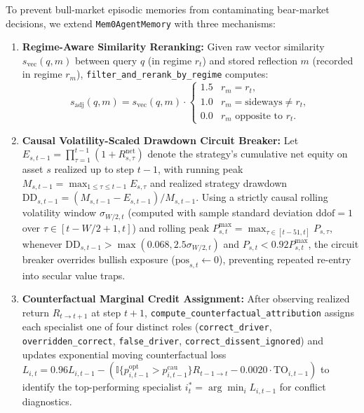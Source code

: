 \documentclass[10pt,a4paper,twocolumn]{article}
\begin{document}
To prevent bull-market episodic memories from contaminating bear-market decisions, we extend \texttt{Mem0AgentMemory} with three mechanisms:
\begin{enumerate}\sloppy
  \setlength{\itemsep}{1pt}\setlength{\parskip}{0pt}
  \item \textbf{Regime-Aware Similarity Reranking:} Given raw vector similarity $s_{\text{vec}}(q, m)$ between query $q$ (in regime $r_t$) and stored reflection $m$ (recorded in regime $r_m$), \texttt{filter\_and\_rerank\_by\_regime} computes:
  \begin{equation}
    s_{\text{adj}}(q, m) = s_{\text{vec}}(q, m) \cdot \begin{cases}
      1.5 & r_m = r_t, \\
      1.0 & r_m = \text{sideways} \neq r_t, \\
      0.0 & r_m \text{ opposite to } r_t.
    \end{cases}
  \end{equation}
  \item \textbf{Causal Volatility-Scaled Drawdown Circuit Breaker:} Let $E_{s,t-1} = \prod_{\tau=1}^{t-1} (1 + R_{s,\tau}^{\text{net}})$ denote the strategy's cumulative net equity on asset $s$ realized up to step $t-1$, with running peak $M_{s,t-1} = \max_{1 \le \tau \le t-1} E_{s,\tau}$ and realized strategy drawdown $\text{DD}_{s,t-1} = (M_{s,t-1} - E_{s,t-1}) / M_{s,t-1}$. Using a strictly causal rolling volatility window $\sigma_{W/2, t}$ (computed with sample standard deviation $\text{ddof}=1$ over $\tau \in [t - W/2 + 1, t]$) and rolling peak $P_{s,t}^{\max} = \max_{\tau \in [t-51, t]} P_{s,\tau}$, whenever $\text{DD}_{s,t-1} > \max(0.068, 2.5\sigma_{W/2,t})$ and $P_{s,t} < 0.92 P_{s,t}^{\max}$, the circuit breaker overrides bullish exposure ($\text{pos}_{s,t} \leftarrow 0$), preventing repeated re-entry into secular value traps.
  \item \textbf{Counterfactual Marginal Credit Assignment:} After observing realized return $R_{t \to t+1}$ at step $t+1$, \texttt{compute\_counterfactual\_attribution} assigns each specialist one of four distinct roles (\texttt{correct\_driver}, \texttt{overridden\_correct}, \texttt{false\_driver}, \texttt{correct\_dissent\_ignored}) and updates exponential moving counterfactual loss $L_{i,t} = 0.96 L_{i,t-1} - (\mathbb{I}\{p_{i,t-1}^{\text{opt}} > p_{i,t-1}^{\text{cau}}\} R_{t-1 \to t} - 0.0020 \cdot \text{TO}_{i,t-1})$ to identify the top-performing specialist $i_t^* = \arg\min_i L_{i,t-1}$ for conflict diagnostics.
\end{enumerate}
\end{document}
